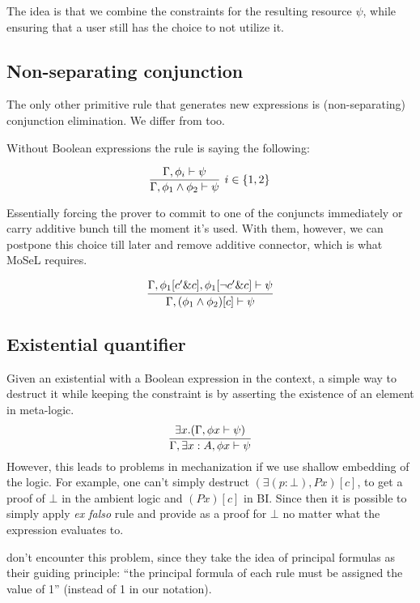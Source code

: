 The idea is that we combine the constraints for the resulting resource \(\psi\), while ensuring that a user still has the choice to not utilize it.

\subsection{Non-separating conjunction}
\label{sec:non-separ-conj}

The only other primitive rule that generates new expressions is (non-separating) conjunction elimination.
We differ from \citet{harlandResourceDistributionBooleanConstraints2003} too.

Without Boolean expressions the rule is saying the following:

\[
\infer[ i \in \{1,2\} ]
      {\Gamma, \phi_1 \wedge \phi_2 \vdash \psi}
      {\Gamma, \phi_i \vdash \psi}
\]

Essentially forcing the prover to commit to one of the conjuncts immediately or carry additive bunch till the moment it's used.
With them, however, we can postpone this choice till later and remove additive connector, which is what MoSeL requires.

\[
\infer{\Gamma, (\phi_1 \wedge \phi_2)[c] \vdash \psi}
      {\Gamma, \phi_1[c' \& c], \phi_1[\neg c' \& c] \vdash \psi}
\]

\subsection{Existential quantifier}
\label{subsec:exist-quant}

Given an existential with a Boolean expression in the context, a simple way to destruct it while keeping the constraint is by asserting the existence of an element in meta-logic.
\[\infer{\Gamma, \exists x : A, \phi x \vdash \psi}
        { \exists x. (\Gamma, \phi x \vdash \psi)}\]
However, this leads to problems in mechanization if we use shallow embedding of the logic.
For example, one can't simply destruct \((\exists (p : \bot), P x)[c]\), to get a proof of \(\bot\) in the ambient logic and \((P x)[c]\) in BI\@.
Since then it is possible to simply apply \emph{ex falso} rule and provide  as a proof for \(\bot\) no matter what the expression evaluates to.

\citet[page 5]{harlandResourceDistributionBooleanConstraints2003} don't encounter this problem, since they take the idea of principal formulas as their guiding principle: ``the principal formula of each rule must be assigned the value of 1'' (\true instead of 1 in our notation).


